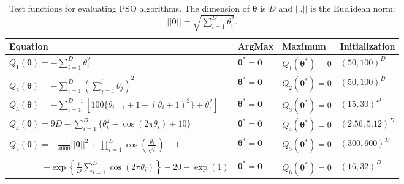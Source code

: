 \documentclass[cmbright]{staauth}
\begin{document}
\begin{table}[h]
\centering
\begin{tabular}{llll}
 Equation & ArgMax & Maximum & Initialization \\\hline
 $Q_1(\bm{\theta}) = -\sum_{i=1}^D\theta_i^2$ & $\bm{\theta}^* = \bm{0}$ & $Q_1(\bm{\theta}^*) = 0$  & $(50, 100)^D$ \\
 $Q_2(\bm{\theta}) = -\sum_{i=1}^D\left(\sum_{j=1}^i \theta_j\right)^2 $ & $\bm{\theta}^* = \bm{0}$ & $Q_2(\bm{\theta}^*) = 0$ & $(50, 100)^D$ \\
 $Q_3(\bm{\theta}) = -\sum_{i=1}^{D-1}\left[100\{\theta_{i+1} + 1 - (\theta_i + 1)^2\} + \theta_i^2\right]$ & $\bm{\theta}^* = \bm{0}$ & $Q_3(\bm{\theta}^*) = 0$ & $(15, 30)^D$ \\
 $Q_4(\bm{\theta}) = 9D - \sum_{i=1}^D\{\theta_i^2 - \cos(2\pi \theta_i) + 10\}$ & $\bm{\theta}^*=\bm{0}$ & $Q_4(\bm{\theta}^*) = 0$ & $(2.56, 5.12)^D$ \\
 $Q_5(\bm{\theta}) = -\frac{1}{4000}||\bm{\theta}||^2 + \prod_{i=1}^D\cos\left(\frac{\theta_i}{\sqrt{i}}\right) - 1$ & $\bm{\theta}^* = \bm{0}$ & $Q_5(\bm{\theta}^*) = 0$ & $(300, 600)^D$ \\
 \shortstack[l]{$Q_6(\bm{\theta}) = 20\exp\left(-0.2\sqrt{\frac{1}{D}||\bm{\theta}||}\right)$ \\ \ \ \ \ \ \ \ \ $+ \exp\left\{\frac{1}{D}\sum_{i=1}^D\cos(2\pi \theta_i)\right\} - 20 - \exp(1)$} & $\bm{\theta}^* = \bm{0}$ & $Q_6(\bm{\theta}^*) = 0$ & $(16, 32)^D$\\\hline
\end{tabular}
\caption{Test functions for evaluating PSO algorithms. The dimension of $\bm{\theta}$ is $D$ and $||.||$ is the Euclidean norm: $||\bm{\theta}|| = \sqrt{\sum_{i=1}^D\theta_i^2}$.}
\label{tab:testfuns}
\end{table}
\end{document}
